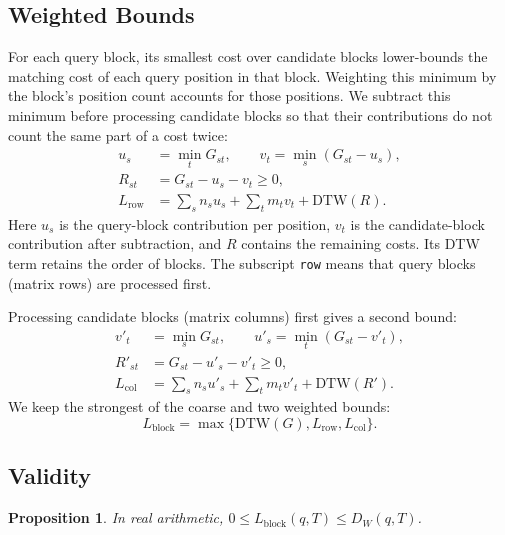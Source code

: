 \documentclass[10pt,conference,letterpaper]{IEEEtran}
\newtheorem{proposition}{Proposition}
\begin{document}
\subsection{Weighted Bounds}
For each query block, its smallest cost over candidate blocks lower-bounds
the matching cost of each query position in that block. Weighting this
minimum by the block's position count accounts for those positions. We
subtract this minimum before processing candidate blocks so that their
contributions do not count the same part of a cost twice:
\begin{equation}
\begin{aligned}
u_s&=\min_t G_{st},\qquad v_t=\min_s(G_{st}-u_s),\\
R_{st}&=G_{st}-u_s-v_t\geq0,\\
L_{\mathrm{row}}&=\sum_s n_su_s+\sum_t m_tv_t+\mathrm{DTW}(R).
\end{aligned}
\end{equation}
Here $u_s$ is the query-block contribution per position, $v_t$ is the
candidate-block contribution after subtraction, and $R$ contains the
remaining costs. Its DTW term retains the order of blocks. The subscript
\texttt{row} means that query blocks (matrix rows) are processed first.

Processing candidate blocks (matrix columns) first gives a second bound:
\begin{equation}
\begin{aligned}
v'_t&=\min_s G_{st},\qquad u'_s=\min_t(G_{st}-v'_t),\\
R'_{st}&=G_{st}-u'_s-v'_t\geq0,\\
L_{\mathrm{col}}&=\sum_s n_su'_s+\sum_t m_tv'_t+\mathrm{DTW}(R').
\end{aligned}
\end{equation}
We keep the strongest of the coarse and two weighted bounds:
\begin{equation}
L_{\mathrm{block}}
=\max\{\mathrm{DTW}(G),L_{\mathrm{row}},L_{\mathrm{col}}\}.
\end{equation}

\subsection{Validity}
\begin{proposition}
In real arithmetic, $0\leq L_{\mathrm{block}}(q,T)\leq D_W(q,T)$.
\end{proposition}
\end{document}
